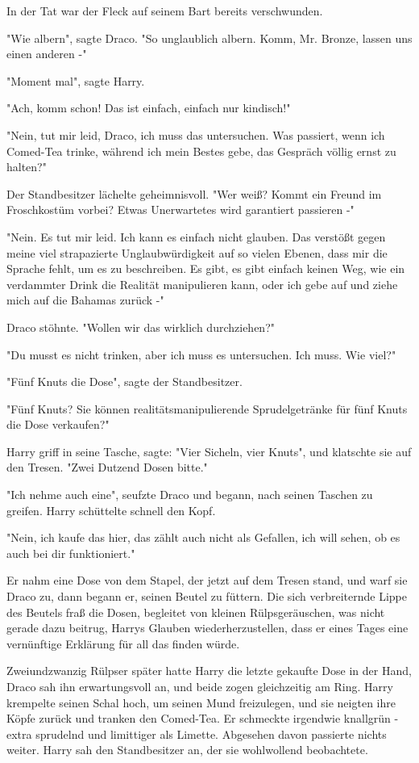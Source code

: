 {In der Tat war der Fleck auf seinem Bart bereits verschwunden.

"Wie albern", sagte Draco. "So unglaublich albern. Komm, Mr. Bronze, lassen uns einen anderen -"

"Moment mal", sagte Harry.

"Ach, komm schon! Das ist einfach, einfach nur kindisch!"

"Nein, tut mir leid, Draco, ich muss das untersuchen. Was passiert, wenn ich Comed-Tea trinke, während ich mein Bestes gebe, das Gespräch völlig ernst zu halten?"

Der Standbesitzer lächelte geheimnisvoll. "Wer weiß? Kommt ein Freund im Froschkostüm vorbei? Etwas Unerwartetes wird garantiert passieren -"

"Nein. Es tut mir leid. Ich kann es einfach nicht glauben. Das verstößt gegen meine viel strapazierte Unglaubwürdigkeit auf so vielen Ebenen, dass mir die Sprache fehlt, um es zu beschreiben. Es gibt, es gibt einfach keinen Weg, wie ein verdammter Drink die Realität manipulieren kann, oder ich gebe auf und ziehe mich auf die Bahamas zurück -"

Draco stöhnte. "Wollen wir das wirklich durchziehen?"

"Du musst es nicht trinken, aber ich muss es untersuchen. Ich muss. Wie viel?"

"Fünf Knuts die Dose", sagte der Standbesitzer.

"Fünf Knuts? Sie können realitätsmanipulierende Sprudelgetränke für fünf Knuts die Dose verkaufen?"

Harry griff in seine Tasche, sagte: "Vier Sicheln, vier Knuts", und klatschte sie auf den Tresen. "Zwei Dutzend Dosen bitte."

"Ich nehme auch eine", seufzte Draco und begann, nach seinen Taschen zu greifen. Harry schüttelte schnell den Kopf.

"Nein, ich kaufe das hier, das zählt auch nicht als Gefallen, ich will sehen, ob es auch bei dir funktioniert."

Er nahm eine Dose von dem Stapel, der jetzt auf dem Tresen stand, und warf sie Draco zu, dann begann er, seinen Beutel zu füttern. Die sich verbreiternde Lippe des Beutels fraß die Dosen, begleitet von kleinen Rülpsgeräuschen, was nicht gerade dazu beitrug, Harrys Glauben wiederherzustellen, dass er eines Tages eine vernünftige Erklärung für all das finden würde.

Zweiundzwanzig Rülpser später hatte Harry die letzte gekaufte Dose in der Hand, Draco sah ihn erwartungsvoll an, und beide zogen gleichzeitig am Ring. Harry krempelte seinen Schal hoch, um seinen Mund freizulegen, und sie neigten ihre Köpfe zurück und tranken den Comed-Tea. Er schmeckte irgendwie knallgrün - extra sprudelnd und limittiger als Limette. Abgesehen davon passierte nichts weiter. Harry sah den Standbesitzer an, der sie wohlwollend beobachtete.

}
